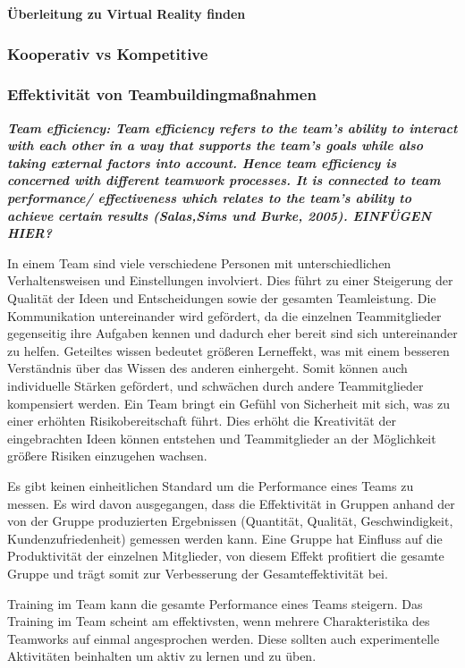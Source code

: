 \documentclass[a4paper,11pt]{article}%
\renewcommand{\\}{\vspace*{0.5\baselineskip} \newline}
\begin{document}
\textbf{Überleitung zu Virtual Reality finden}


	\subsubsection{Kooperativ vs Kompetitive}
	
		\subsubsection{Effektivität von Teambuildingmaßnahmen}
		
	\textit{\textbf{Team efficiency: Team efficiency refers to the team’s ability to interact with each other in a way that supports the team’s goals while also taking external factors into account. Hence team efficiency is concerned with different teamwork processes. It is connected to team performance/ effectiveness which relates to the team’s ability to achieve certain results (Salas,Sims und Burke, 2005). EINFÜGEN HIER?}}
	
	In einem Team sind viele verschiedene Personen mit unterschiedlichen Verhaltensweisen und Einstellungen involviert. Dies führt zu einer Steigerung der Qualität der Ideen und Entscheidungen sowie der gesamten Teamleistung.
	Die Kommunikation untereinander wird gefördert, da die einzelnen Teammitglieder gegenseitig ihre Aufgaben kennen und dadurch eher bereit sind sich untereinander zu helfen.
	Geteiltes wissen bedeutet größeren Lerneffekt, was mit einem besseren Verständnis über das Wissen des anderen einhergeht. Somit können auch individuelle Stärken gefördert, und schwächen durch andere Teammitglieder kompensiert werden.
	Ein Team bringt ein Gefühl von Sicherheit mit sich, was zu einer erhöhten Risikobereitschaft führt. Dies erhöht die Kreativität der eingebrachten Ideen können entstehen und Teammitglieder an der Möglichkeit größere Risiken einzugehen wachsen. \citep[p. 2-4]{biech2007pfeiffer}
	
	Es gibt keinen einheitlichen Standard um die Performance eines Teams zu messen. Es wird davon ausgegangen, dass die Effektivität in Gruppen anhand der von der Gruppe produzierten Ergebnissen (Quantität, Qualität, Geschwindigkeit, Kundenzufriedenheit) gemessen werden kann. Eine Gruppe hat Einfluss auf die Produktivität der einzelnen Mitglieder, von diesem Effekt profitiert die gesamte Gruppe und trägt somit zur Verbesserung der Gesamteffektivität bei. \citep[p.309]{guzzo1996teams}
	
	Training im Team kann die gesamte Performance eines Teams steigern. Das Training im Team scheint am effektivsten, wenn mehrere Charakteristika des Teamworks auf einmal angesprochen werden. Diese sollten auch experimentelle Aktivitäten beinhalten um aktiv zu lernen und zu üben. \citep[19]{mcewan2017effectiveness}
	
\end{document}
